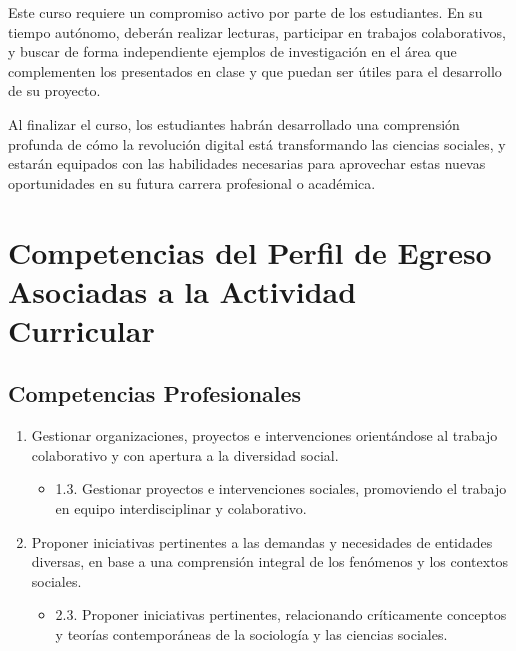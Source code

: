 \documentclass[11pt,letter,]{article}
\providecommand{\tightlist}{%
  \setlength{\itemsep}{0pt}\setlength{\parskip}{0pt}}
\begin{document}
Este curso requiere un compromiso activo por parte de los estudiantes.
En su tiempo autónomo, deberán realizar lecturas, participar en trabajos
colaborativos, y buscar de forma independiente ejemplos de investigación
en el área que complementen los presentados en clase y que puedan ser
útiles para el desarrollo de su proyecto.

Al finalizar el curso, los estudiantes habrán desarrollado una
comprensión profunda de cómo la revolución digital está transformando
las ciencias sociales, y estarán equipados con las habilidades
necesarias para aprovechar estas nuevas oportunidades en su futura
carrera profesional o académica.

\hypertarget{competencias-del-perfil-de-egreso-asociadas-a-la-actividad-curricular}{%
\section{Competencias del Perfil de Egreso Asociadas a la Actividad
Curricular}\label{competencias-del-perfil-de-egreso-asociadas-a-la-actividad-curricular}}

\hypertarget{competencias-profesionales}{%
\subsection{Competencias
Profesionales}\label{competencias-profesionales}}

\begin{enumerate}
\def\labelenumi{\arabic{enumi}.}
\tightlist
\item
  Gestionar organizaciones, proyectos e intervenciones orientándose al
  trabajo colaborativo y con apertura a la diversidad social.

  \begin{itemize}
  \tightlist
  \item
    1.3. Gestionar proyectos e intervenciones sociales, promoviendo el
    trabajo en equipo interdisciplinar y colaborativo.
  \end{itemize}
\item
  Proponer iniciativas pertinentes a las demandas y necesidades de
  entidades diversas, en base a una comprensión integral de los
  fenómenos y los contextos sociales.

  \begin{itemize}
  \tightlist
  \item
    2.3. Proponer iniciativas pertinentes, relacionando críticamente
    conceptos y teorías contemporáneas de la sociología y las ciencias
    sociales.
  \end{itemize}
\end{enumerate}
\end{document}
